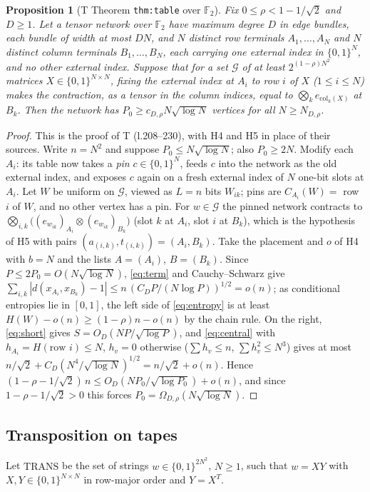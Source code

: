 \documentclass[11pt]{article}
\newtheorem{proposition}[theorem]{Proposition}
\theoremstyle{definition}
\theoremstyle{remark}
\newcommand{\F}{\mathbb F}
\newcommand{\TRANS}{\mathrm{TRANS}}
\begin{document}
\begin{proposition}[T Theorem \texttt{thm:table} over $\F_2$]\label{prop:table}
Fix $0\le\rho<1-1/\sqrt2$ and $D\ge1$. Let a tensor network over $\F_2$ have maximum degree $D$ in edge bundles, each bundle of
width at most $DN$, and $N$ distinct row terminals $A_1,\dots,A_N$ and $N$ distinct column terminals $B_1,\dots,B_N$, each
carrying one external index in $\{0,1\}^N$, and no other external index. Suppose that for a set $\mathcal G$ of at least
$2^{(1-\rho)N^2}$ matrices $X\in\{0,1\}^{N\times N}$, fixing the external index at $A_i$ to row $i$ of $X$ ($1\le i\le N$) makes
the contraction, as a tensor in the column indices, equal to $\bigotimes_k e_{\mathrm{col}_k(X)}$ at $B_k$. Then the network has
$P_0\ge c_{D,\rho}N\sqrt{\log N}$ vertices for all $N\ge N_{D,\rho}$.
\end{proposition}
\begin{proof}
This is the proof of T (l.208--230), with H4 and H5 in place of their sources. Write $n=N^2$ and suppose $P_0\le N\sqrt{\log N}$;
also $P_0\ge2N$. Modify each $A_i$: its table now takes a \emph{pin} $c\in\{0,1\}^N$, feeds $c$ into the network as the old external
index, and exposes $c$ again on a fresh external index of $N$ one-bit slots at $A_i$. Let $W$ be uniform on $\mathcal G$, viewed as
$L=n$ bits $W_{ik}$; pins are $C_{A_i}(W)=$ row $i$ of $W$, and no other vertex has a pin. For $w\in\mathcal G$ the pinned network
contracts to $\bigotimes_{i,k}\bigl((e_{w_{ik}})_{A_i}\otimes(e_{w_{ik}})_{B_k}\bigr)$ (slot $k$ at $A_i$, slot $i$ at $B_k$),
which is the hypothesis of H5 with pairs $(a_{(i,k)},t_{(i,k)})=(A_i,B_k)$. Take the placement and $o$ of H4 with $b=N$ and the
lists $A=(A_i)$, $B=(B_k)$. Since $P\le2P_0=O(N\sqrt{\log N})$, \eqref{eq:term} and Cauchy--Schwarz give
$\sum_{i,k}|d(x_{A_i},x_{B_k})-1|\le n\,(C_DP/(N\log P))^{1/2}=o(n)$; as conditional entropies lie in $[0,1]$, the left side of
\eqref{eq:entropy} is at least $H(W)-o(n)\ge(1-\rho)n-o(n)$ by the chain rule. On the right, \eqref{eq:short} gives
$S=O_D(NP/\sqrt{\log P})$, and \eqref{eq:central} with $h_{A_i}=H(\text{row }i)\le N$, $h_v=0$ otherwise
($\sum h_v\le n$, $\sum h_v^2\le N^3$) gives at most $n/\sqrt2+C_D(N^4/\sqrt{\log N})^{1/2}=n/\sqrt2+o(n)$. Hence
$(1-\rho-1/\sqrt2)\,n\le O_D(NP_0/\sqrt{\log P_0})+o(n)$, and since $1-\rho-1/\sqrt2>0$ this forces $P_0=\Omega_{D,\rho}(N\sqrt{\log N})$.
\end{proof}

\subsection{Transposition on tapes}
Let $\TRANS$ be the set of strings $w\in\{0,1\}^{2N^2}$, $N\ge1$, such that $w=XY$ with $X,Y\in\{0,1\}^{N\times N}$ in row-major
order and $Y=X^{T}$.
\end{document}
